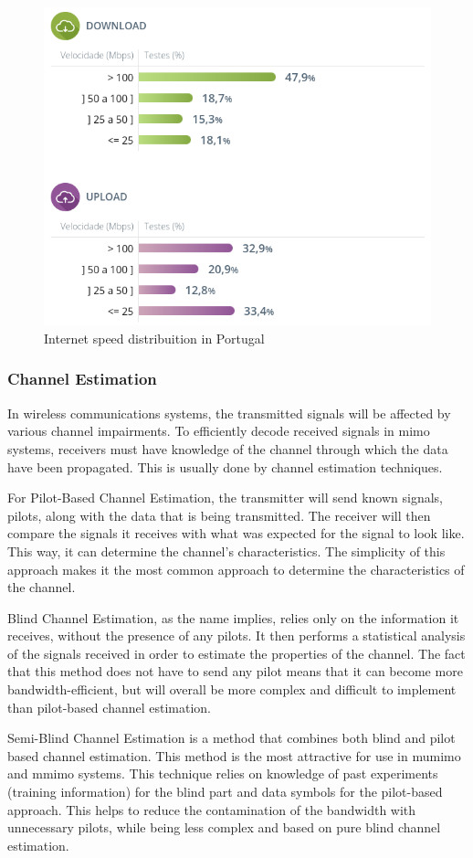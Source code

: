 \begin{figure}[H]
    \vspace*{0cm}
    \centering
    \includegraphics[width=0.5\linewidth]{figs/ch_2_netmed.png}
    \caption{Internet speed distribuition in Portugal\cite{ANACOM2023EstastisticasNET.mede}}
    \label{fig:ch_2_netmed.png}
\end{figure}

\subsubsection{Channel Estimation}
\par In wireless communications systems, the transmitted signals will be affected by various channel impairments. To efficiently decode received signals in \ac{mimo} systems, receivers must have knowledge of the channel through which the data have been propagated. This is usually done by channel estimation techniques.

\par For Pilot-Based Channel Estimation, the transmitter will send known signals, pilots, along with the data that is being transmitted. The receiver will then compare the signals it receives with what was expected for the signal to look like. This way, it can determine the channel's characteristics. The simplicity of this approach makes it the most common approach to determine the characteristics of the channel.

\par Blind Channel Estimation, as the name implies, relies only on the information it receives, without the presence of any pilots. It then performs a statistical analysis of the signals received in order to estimate the properties of the channel. The fact that this method does not have to send any pilot means that it can become more bandwidth-efficient, but will overall be more complex and difficult to implement than pilot-based channel estimation.

\par Semi-Blind Channel Estimation is a method that combines both blind and pilot based channel estimation. This method is the most attractive for use in \ac{mumimo} and \ac{mmimo} systems. This technique relies on knowledge of past experiments (training information) for the blind part and data symbols for the pilot-based approach. This helps to reduce the contamination of the bandwidth with unnecessary pilots, while being less complex and based on pure blind channel estimation\cite{Nayebi2018Semi-blindSystems}.

